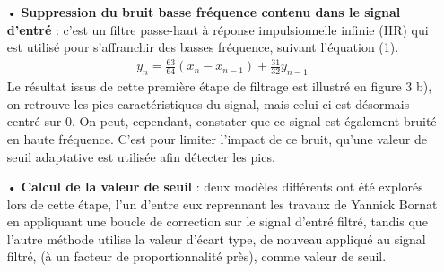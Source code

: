 \documentclass[a4paper,12pt]{article}
\begin{document}
\begin{itemize}
\item[•] \textbf{Suppression du bruit basse fréquence contenu dans le signal d'entré} : c'est un filtre passe-haut à réponse impulsionnelle infinie (IIR) qui est utilisé pour s'affranchir des basses fréquence, suivant l'équation (1).
\begin{eqnarray}
y_n = \frac{63}{64}\left(x_n - x_{n-1}\right) + \frac{31}{32}y_{n-1}
\end{eqnarray}
Le résultat issus de cette première étape de filtrage est illustré en figure 3 b), on retrouve les pics caractéristiques du signal, mais celui-ci est désormais centré sur 0. On peut, cependant, constater que ce signal est également bruité en haute fréquence. C'est pour limiter l'impact de ce bruit, qu'une valeur de seuil adaptative est utilisée afin détecter les pics.\\

\item[•] \textbf{Calcul de la valeur de seuil} : deux modèles différents ont été explorés lors de cette étape, l'un d'entre eux reprennant les travaux de Yannick Bornat en appliquant une boucle de correction sur le signal d'entré filtré, tandis que l'autre méthode utilise la valeur d'écart type, de nouveau appliqué au signal filtré, (à un facteur de proportionnalité près), comme valeur de seuil.\\


\end{itemize}
\end{document}
